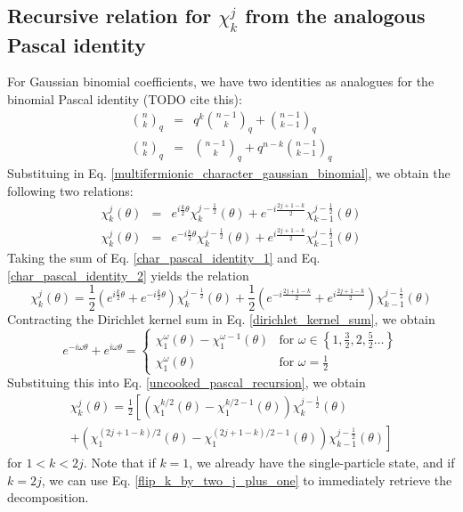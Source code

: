 \documentclass[12pt]{article}
\begin{document}
	\subsection{Recursive relation for $\chi^j_k$ from the analogous Pascal identity}
	For Gaussian binomial coefficients, we have two identities as analogues for the binomial Pascal identity (TODO cite this):
	\begin{eqnarray}
	{n\choose k}_q &=& q^k {{n-1}\choose k}_q + {{n-1}\choose {k-1}}_q \label{pascal_identity_1}\\
	{n\choose k}_q &=& {{n-1}\choose k}_q + q^{n-k} {{n-1}\choose {k-1}}_q \label{pascal_identity_2}
	\end{eqnarray}
	Substituing in Eq. \ref{multifermionic_character_gaussian_binomial}, we obtain the following two relations:
	\begin{eqnarray}
	\chi^j_k(\theta) &=& e^{i\frac{k}{2}\theta} \chi^{j-\frac{1}{2}}_k(\theta) + e^{-i\frac{2j+1-k}{2}} \chi^{j-\frac{1}{2}}_{k-1}(\theta)\label{char_pascal_identity_1}\\
	\chi^j_k(\theta) &=& e^{-i\frac{k}{2}\theta} \chi^{j-\frac{1}{2}}_k(\theta) + e^{i\frac{2j+1-k}{2}} \chi^{j-\frac{1}{2}}_{k-1}(\theta) \label{char_pascal_identity_2}
	\end{eqnarray}
	Taking the sum of Eq. \ref{char_pascal_identity_1} and Eq. \ref{char_pascal_identity_2} yields the relation
	\begin{equation} \label{uncooked_pascal_recursion}
	\chi^j_k(\theta) = \frac{1}{2}\left(e^{i\frac{k}{2}\theta}+e^{-i\frac{k}{2}\theta}\right)\chi^{j-\frac{1}{2}}_k(\theta) + \frac{1}{2}\left(e^{-i\frac{2j+1-k}{2}} + e^{i\frac{2j+1-k}{2}}\right) \chi^{j-\frac{1}{2}}_{k-1}(\theta)
	\end{equation}
	Contracting the Dirichlet kernel sum in Eq. \ref{dirichlet_kernel_sum}, we obtain
	\begin{equation} \label{q_plus_q_inverse}
	e^{-i\omega\theta}+e^{i\omega\theta} = \begin{cases}
	\chi^\omega_1(\theta)-\chi^{\omega-1}_1(\theta) & \text{for } \omega \in \left\{1, \frac{3}{2}, 2, \frac{5}{2}\dots\right\}\\
	\chi^\omega_1(\theta) & \text{for } \omega = \frac{1}{2}
	\end{cases}
	\end{equation}
	Substituing this into Eq. \ref{uncooked_pascal_recursion}, we obtain
	\begin{multline}  \label{pascal_recursion}
	\chi^j_k(\theta) = \frac{1}{2}\left[\left(\chi^{k/2}_1(\theta)-\chi^{k/2-1}_1(\theta)\right)\chi^{j-\frac{1}{2}}_k(\theta)\right.\\
	 \left.+ \left(\chi^{(2j+1-k)/2}_1(\theta)-\chi^{(2j+1-k)/2-1}_1(\theta)\right) \chi^{j-\frac{1}{2}}_{k-1}(\theta)\right]
	\end{multline}
	for $1<k<2j$. Note that if $k=1$, we already have the single-particle state, and if $k=2j$, we can use Eq. \ref{flip_k_by_two_j_plus_one} to immediately retrieve the decomposition.
	
\end{document}
